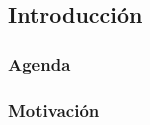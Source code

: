 \subsection{Introducción}

\watermarkon
\begin{frame}
	\frametitle{Agenda}
	
\end{frame}
\watermarkoff


\begin{frame}[t,fragile]
	\frametitle {Motivación }
	

\end{frame}
